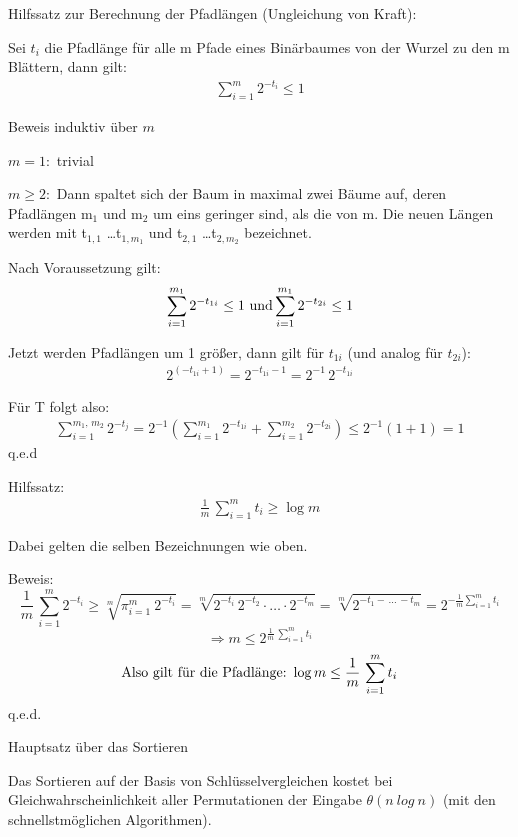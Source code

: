 % 
Hilfssatz zur Berechnung der Pfadlängen (Ungleichung von Kraft):

\noindent
Sei $t_{i}$ die Pfadlänge für alle m Pfade eines Binärbaumes von der Wurzel zu den m Blättern, dann gilt:
\begin{gather*}
\sum_{i=1}^{m} 2^{-t_{i}}\leq 1
\end{gather*} 


Beweis induktiv über $m$

\noindent
$m = 1:$ trivial

\noindent
$m \geq 2:$ Dann spaltet sich der Baum in maximal zwei Bäume auf, deren Pfadlängen m$_1$ und m$_2$ um eins geringer sind, als die
von m. Die neuen Längen werden mit t$_{1,1}$ \ldots t$_{1,m_1}$ und t$_{2,1}$ \ldots t$_{2,m_2}$ bezeichnet.
\bigskip

Nach Voraussetzung gilt:
\begin{gather*}
\sum_{i=1}^{m_{1}} 2^{-t_{1i}}\leq 1\ \textup{und}  \sum_{i=1}^{m_{1}} 2^{-t_{2i}}\leq 1
\end{gather*}

Jetzt werden Pfadlängen um 1 größer, dann gilt für $t_{1i}$ (und analog für $t_{2i}$):
\begin{gather*}
2^{(-t_{1i}+1)}=2^{-t_{1i}-1}=2^{-1}\,2^{-t_{1i}}
\end{gather*}

Für T folgt also:
\begin{gather*}
\sum_{i=1}^{m_1,\, m_2} 2^{-t_{j}}=2^{-1}\left(\sum_{i=1}^{m_{1}} 2^{-t_{1i}}+\sum_{i=1}^{m_{2}} 2^{-t_{2i}}\right)
\leq 2^{-1}(1+1)=1
\end{gather*}
\hfill  q.e.d

Hilfssatz:
\begin{gather*}
\frac{1}{m}\, \sum_{i=1}^{m}t_{i}\geq \log m
\end{gather*}

Dabei gelten die selben Bezeichnungen wie oben.

Beweis:
\[
\frac{1}{m}\,  \sum_{i=1}^{m}2^{-t_{i}} \geq \sqrt[m]{\pi_{i=1}^{m}\ 2^{-t_{i}}}=\sqrt[m]{2^{-t_i}\, 2^{-t_2}\cdot \ldots \cdot 2^{-t_m}}
=\sqrt[m]{2^{-t_1-\, \ldots \, -t_m}}= 2^{-\frac{1}{m}\sum_{i=1}^{m}t_i}
\]
\[
\Rightarrow m \leq 2^{\frac{1}{m}\, \sum_{i=1}^{m}t_i}
\]
\[
\textup{Also gilt für die Pfadlänge:}\ \log m \leq\frac{1}{m}\, \sum_{i=1}^{m}t_i
\]
\hfill q.e.d.

\begin{satz}
Hauptsatz über das Sortieren

Das Sortieren auf der Basis von Schlüsselvergleichen kostet bei Gleichwahrscheinlichkeit aller Permutationen der Eingabe
$\theta (n\ log\ n)$ (mit den schnellstmöglichen Algorithmen).
\end{satz}

